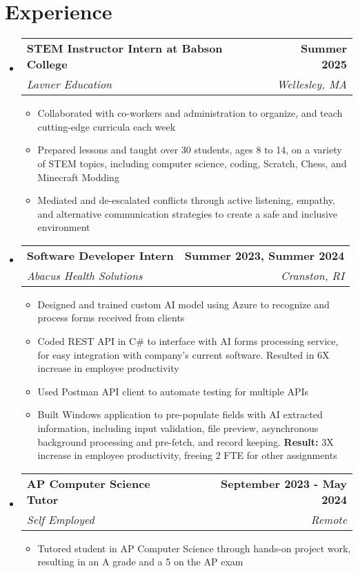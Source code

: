 \documentclass[letterpaper,11pt]{article}
\makeatletter
\newcommand{\resumeItem}[1]{
  \item\small{
    \begin{minipage}[t]{\dimexpr\linewidth-0.2in}
      {#1 \vspace{-2pt}}
    \end{minipage}
  }
}
\newcommand{\resumeSubheading}[4]{
  \vspace{-2pt}\item
    \begin{tabular*}{1.0\textwidth}[t]{l@{\extracolsep{\fill}}r}
      \textbf{#1} & \textbf{\small #2} \\
      \textit{\small#3} & \textit{\small #4} \\
    \end{tabular*}\vspace{-7pt}
}
\newcommand{\resumeSubHeadingListStart}{\begin{itemize}[leftmargin=0.0in, label={}]}
\newcommand{\resumeSubHeadingListEnd}{\end{itemize}}
\newcommand{\resumeItemListStart}{\begin{itemize}}
\newcommand{\resumeItemListEnd}{\end{itemize}\vspace{-5pt}}
\makeatother
\begin{document}
\section{Experience}
  \resumeSubHeadingListStart

    \resumeSubheading
      {STEM Instructor Intern at Babson College}{Summer 2025}
      {Lavner Education}{Wellesley, MA}
      \resumeItemListStart
        \resumeItem{Collaborated with co-workers and administration to organize, and teach cutting-edge curricula each week}
        \resumeItem{Prepared lessons and taught over 30 students, ages 8 to 14, on a variety of STEM topics, including computer science, coding, Scratch, Chess, and Minecraft Modding}
        \vspace{2pt}
        \resumeItem{Mediated and de-escalated conflicts through active listening, empathy, and alternative communication strategies to create a safe and inclusive environment}
      \resumeItemListEnd
      
    \resumeSubheading
      {Software Developer Intern}{Summer 2023, Summer 2024}
      {Abacus Health Solutions}{Cranston, RI}
      \resumeItemListStart
        \resumeItem{Designed and trained custom AI model using Azure to recognize and process forms received from clients}
        \resumeItem{Coded REST API in C\# to interface with AI forms processing service, for easy integration with company's current software. Resulted in 6X increase in employee productivity}
        \vspace{2pt}
        \resumeItem{Used Postman API client to automate testing for multiple APIs}
        \vspace{-2pt}
        \resumeItem{Built Windows application to pre-populate fields with AI extracted information, including input validation, file preview, asynchronous background processing and pre-fetch, and record keeping. \textbf{Result:} 3X increase in employee productivity, freeing 2 FTE for other assignments}
        \vspace{1pt}
    \resumeItemListEnd
          
    \resumeSubheading
      {AP Computer Science Tutor}{September 2023 - May 2024}
      {Self Employed}{Remote}
      \resumeItemListStart
        \resumeItem{Tutored student in AP Computer Science through hands-on project work, resulting in an A grade and a 5 on the AP exam}
        \resumeItemListEnd
  \resumeSubHeadingListEnd
\vspace{-16pt}

\end{document}
